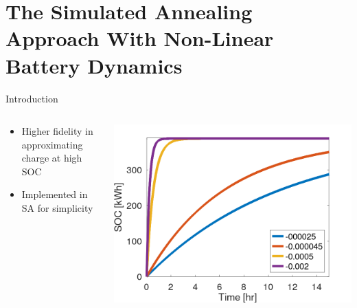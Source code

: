 \documentclass[aspectratio=169]{beamer}
\begin{document}
\section{The Simulated Annealing Approach With Non-Linear Battery Dynamics}
\label{sec:orgbcb7d80}
\begin{frame}[label={sec:orgdc663e5}]{Introduction}
\begin{columns}
\begin{column}{0.3\columnwidth}
\begin{itemize}
\item Higher fidelity in approximating charge at high SOC
\item Implemented in SA for simplicity
\end{itemize}
\end{column}

\begin{column}{0.7\columnwidth}
\begin{center}
\includegraphics[width=.9\linewidth]{./img/nonlinear-bat.png}
\end{center}
\end{column}
\end{columns}
\end{frame}
\end{document}
